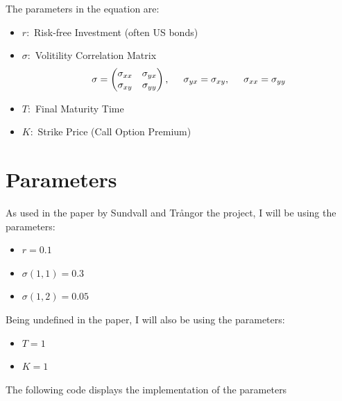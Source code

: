 \documentclass[12pt,letterpaper]{article}
\begin{document}
The parameters in the equation are:
\begin{itemize}
    \item $r:$ Risk-free Investment (often US bonds)
    \item $\sigma:$ Volitility Correlation Matrix \begin{equation*}\sigma = \begin{pmatrix}
        \sigma_{xx}  & \sigma_{yx}  \\
        \sigma_{xy}  & \sigma_{yy}
    \end{pmatrix},\hspace{0.5cm} \sigma_{yx} = \sigma_{xy},\hspace{0.5cm} \sigma_{xx} = \sigma_{yy}\end{equation*}
    \item $T:$ Final Maturity Time
    \item $K:$ Strike Price (Call Option Premium)
\end{itemize}

\newpage
\section*{Parameters}

As used in the paper by Sundvall and Trångor the project, I will be using the parameters:
\begin{itemize}
    \item $r=0.1$
    \item $\sigma(1,1) = 0.3$
    \item $\sigma(1,2) = 0.05$
\end{itemize}

Being undefined in the paper, I will also be using the parameters:
\begin{itemize}
    \item $T=1$
    \item $K=1$
\end{itemize}

The following code displays the implementation of the parameters
\end{document}
